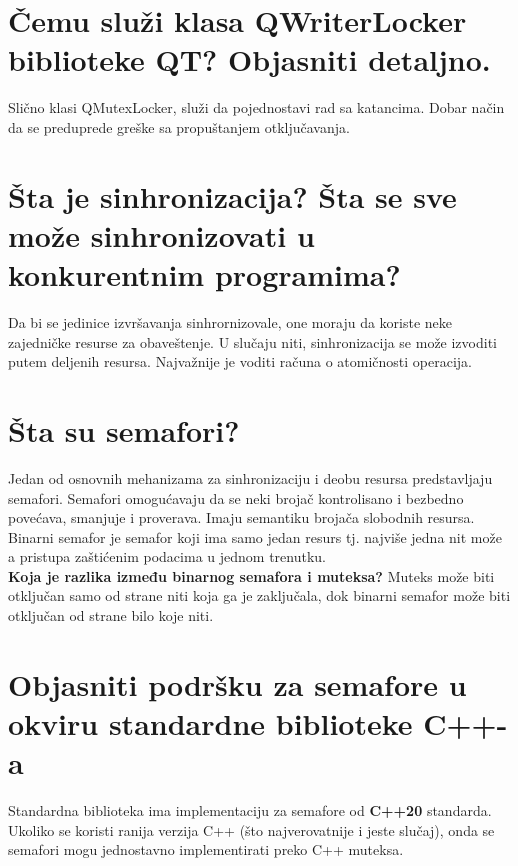 \documentclass[a4paper]{article}
\begin{document}
\section{Čemu služi klasa QWriterLocker biblioteke QT? Objasniti detaljno.}

  Slično klasi QMutexLocker, služi da pojednostavi rad sa katancima. 
  Dobar način da se preduprede greške sa propuštanjem otključavanja.
  
\section{Šta je sinhronizacija?	Šta se sve može sinhronizovati u konkurentnim programima?}
  Da bi se jedinice izvršavanja sinhrornizovale, one moraju da koriste neke zajedničke 
  resurse za obaveštenje. U slučaju niti, sinhronizacija se može izvoditi putem deljenih resursa. 
  Najvažnije je voditi računa o atomičnosti operacija.
  
\section{Šta su semafori?}
  Jedan od osnovnih mehanizama za sinhronizaciju i deobu resursa predstavljaju semafori. 
  Semafori omogućavaju da se neki brojač kontrolisano i bezbedno povećava, smanjuje i proverava. 
  Imaju semantiku brojača slobodnih resursa.\\

  Binarni semafor je semafor koji ima samo jedan resurs tj. najviše jedna nit može a pristupa 
  zaštićenim podacima u jednom trenutku.\\
  \indent \textbf{Koja je razlika između binarnog semafora i muteksa?} Muteks može biti 
  otključan samo od strane niti koja ga je zaključala, dok binarni semafor može biti otključan od 
  strane bilo koje niti.
  
\section{Objasniti podršku za semafore u okviru standardne biblioteke C++-a}
  Standardna biblioteka ima implementaciju za semafore od \textbf{C++20} standarda.
  Ukoliko se koristi ranija verzija C++ (što najverovatnije i jeste slučaj), onda
  se semafori mogu jednostavno implementirati preko C++ muteksa. 
  \cite{cppref_semaphore}
\end{document}
